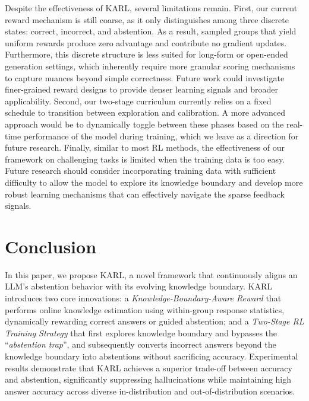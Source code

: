 \documentclass{article} %
\newcommand{\framename}{\textsc{KARL}}
\begin{document}
Despite the effectiveness of KARL, several limitations remain.
First, our current reward mechanism is still coarse, as it only distinguishes among three discrete states: correct, incorrect, and abstention.
As a result, sampled groups that yield uniform rewards produce zero advantage and contribute no gradient updates.
Furthermore, this discrete structure is less suited for long-form or open-ended generation settings, which inherently require more granular scoring mechanisms to capture nuances beyond simple correctness. Future work could investigate finer-grained reward designs to provide denser learning signals and broader applicability.
Second, our two-stage curriculum currently relies on a fixed schedule to transition between exploration and calibration.
A more advanced approach would be to dynamically toggle between these phases based on the real-time performance of the model during training, which we leave as a direction for future research.
Finally, similar to most RL methods, the effectiveness of our framework on challenging tasks is limited when the training data is too easy. Future research should consider incorporating training data with sufficient difficulty to allow the model to explore its knowledge boundary and develop more robust learning mechanisms that can effectively navigate the sparse feedback signals.


\section{Conclusion}
\label{sec:bibtex}
In this paper, we propose \framename{}, a novel framework that continuously aligns an LLM's abstention behavior with its evolving knowledge boundary. \framename{} introduces two core innovations: a \textit{Knowledge-Boundary-Aware Reward} that performs online knowledge estimation using within-group response statistics, dynamically rewarding correct answers or guided abstention; and a \textit{Two-Stage RL Training Strategy} that first explores knowledge boundary and bypasses the ``\textit{abstention trap}'', and subsequently converts incorrect answers beyond the knowledge boundary into abstentions without sacrificing accuracy. Experimental results demonstrate that \framename{} achieves a superior trade-off between accuracy and abstention, significantly suppressing hallucinations while maintaining high answer accuracy across diverse in-distribution and out-of-distribution scenarios.
\end{document}
